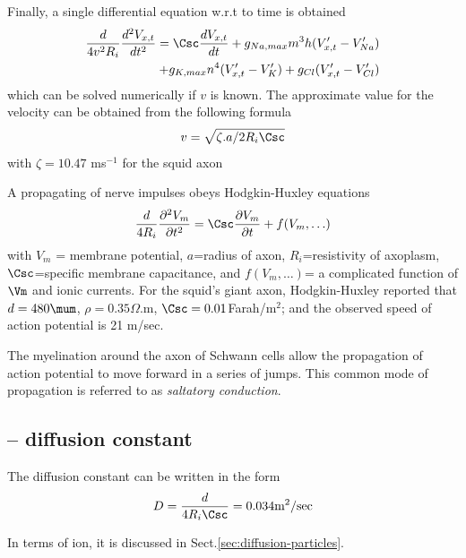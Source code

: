 Finally, a single differential equation w.r.t to time is obtained
\begin{equation}
\begin{split}
 \frac{d}{4v^2R_i}\frac{d^2V_{x,t}}{dt^2} = \Csc \frac{dV_{x,t}}{dt} +
 g_{Na,max} m^3h(V'_{x,t} - V'_{Na}) \\
  + g_{K,max}n^4 (V'_{x,t} - V'_{K})
  + g_{Cl} (V'_{x,t} - V'_{Cl})  
\end{split}
\end{equation}
which can be solved numerically if $v$ is known. The approximate value
for the velocity can be obtained from the following formula
\begin{equation}
  v = \sqrt{\zeta.a/2R_i \Csc}
\end{equation}
with $\zeta = 10.47$ ms$^{-1}$ for the squid axon


A propagating of nerve impulses obeys Hodgkin-Huxley equations
\begin{equation}
\label{eq:cable_HH}
\frac{d}{4R_i}\frac{\partial^2 V_m}{\partial t^2} = \Csc \frac{\partial
V_m}{\partial t} + f(V_m, \ldots)
\end{equation}
with $V_m$ = membrane potential, $a$=radius of axon, $R_i$=resistivity of
axoplasm, $\Csc$=specific membrane capacitance, and $f(V_m,\ldots)$= a
complicated function of $\Vm$ and ionic currents. For the squid's giant axon,
Hodgkin-Huxley reported that $d=480 \mum$, $\rho=0.35 \Omega$.m,
$\Csc=0.01$Farah/m$^2$; and the observed speed of action potential is 21 m/sec.

The myelination around the axon of Schwann cells allow the propagation
of action potential to move forward in a series of jumps. This common
mode of propagation is referred to as {\it saltatory conduction}.

\subsection{-- diffusion constant}

The diffusion constant can be written in the form
\begin{equation}
D = \frac{d}{4R_i \Csc} = 0.034 \text{m}^2/\text{sec}
\end{equation}

In terms of ion, it is discussed in
Sect.\ref{sec:diffusion-particles}.

